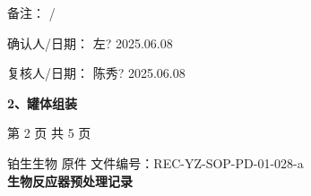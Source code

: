 \documentclass[UTF8,10pt,a4paper,fontset=fandol]{ctexart}
\newcommand{\fieldvalue}[1]{#1}
\newcommand{\handwritten}[1]{#1}
\begin{document}
\vspace{0.5em}

备注：
\fieldvalue{\handwritten{/}}

\vspace{1em}

确认人/日期：
\fieldvalue{\handwritten{左? 2025.06.08}}

\hfill 复核人/日期：
\fieldvalue{\handwritten{陈秀? 2025.06.08}}

\vspace{0.5em}

\textbf{2、罐体组装}

\begin{center}
第 2 页 共 5 页
\end{center}

\newpage

\begin{center}
{\small 铂生生物 \qquad 原件 \qquad 文件编号：REC-YZ-SOP-PD-01-028-a}\\
\textbf{生物反应器预处理记录}
\end{center}
\end{document}
